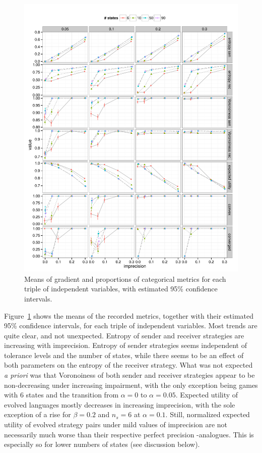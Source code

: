 \documentclass[fleqn,reqno,10pt]{article}
\newcommand{\rd}{\acro{rd}} %
\newcommand{\impairment}{\ensuremath{\alpha}} %
\newcommand{\toler}{\ensuremath{\beta}} %
\begin{document}
\begin{figure}
  \centering
  
  \includegraphics[width=\textwidth]{plots/MeanMetrics2.pdf}

  \caption{Means of gradient and proportions of categorical metrics for
    each triple of independent variables, with estimated 95\%
    confidence intervals.}
  \label{fig:MeanMetrics}
\end{figure}

Figure~\ref{fig:MeanMetrics} shows the means of the recorded metrics,
together with their estimated 95\% confidence intervals, for each
triple of independent variables. Most trends are quite clear, and not
unexpected. Entropy of sender and receiver strategies are increasing
with imprecision. Entropy of sender strategies seems independent of
tolerance levels and the number of states, while there seems to be an
effect of both parameters on the entropy of the receiver
strategy. What was not expected \emph{a priori} was that Voronoiness
of both sender and receiver strategies appear to be non-decreasing
under increasing impairment, with the only exception being games with
6 states and the transition from $\impairment = 0$ to $\impairment =
0.05$. Expected utility of evolved languages mostly decreases in
increasing imprecision, with the sole exception of a rise for $\toler
= 0.2$ and $n_s = 6$ at $\impairment = 0.1$. Still, normalized
expected utility of evolved strategy pairs under mild values of
imprecision are not necessarily much worse than their respective
perfect precision \rd-analogues. This is especially so for lower
numbers of states (see discussion below).
\end{document}
